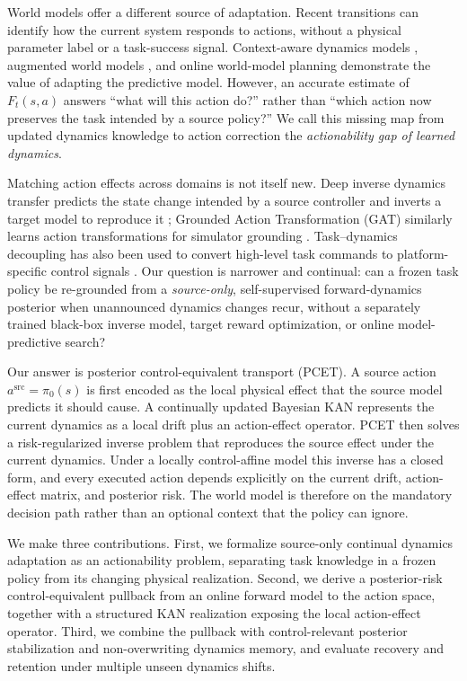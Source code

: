 \documentclass[letterpaper]{article}
\begin{document}
World models offer a different source of adaptation.  Recent transitions can
identify how the current system responds to actions, without a physical
parameter label or a task-success signal.  Context-aware dynamics models
\cite{lee2020cadm}, augmented world models \cite{ball2021augwm}, and online
world-model planning \cite{liu2025onlinewm} demonstrate the value of adapting
the predictive model.  However, an accurate estimate of
$F_t(s,a)$ answers ``what will this action do?'' rather than ``which action now
preserves the task intended by a source policy?''  We call this missing map
from updated dynamics knowledge to action correction the \emph{actionability
gap of learned dynamics}.

Matching action effects across domains is not itself new.  Deep inverse
dynamics transfer predicts the state change intended by a source controller
and inverts a target model to reproduce it \cite{christiano2016inverse};
Grounded Action Transformation (GAT) similarly learns action transformations
for simulator grounding \cite{hanna2021gat}.  Task--dynamics decoupling has
also been used to convert high-level task commands to platform-specific control
signals \cite{liu2023dttd}.  Our question is narrower and continual: can a
frozen task policy be re-grounded from a \emph{source-only}, self-supervised
forward-dynamics posterior when unannounced dynamics changes recur, without a
separately trained black-box inverse model, target reward optimization, or
online model-predictive search?

Our answer is posterior control-equivalent transport (PCET).  A source action
$a^{\mathrm{src}}=\pi_0(s)$ is first encoded as the local physical effect that
the source model predicts it should cause.  A continually updated Bayesian KAN
represents the current dynamics as a local drift plus an action-effect operator.
PCET then solves a risk-regularized inverse problem that reproduces the source
effect under the current dynamics.  Under a locally control-affine model this
inverse has a closed form, and every executed action depends explicitly on the
current drift, action-effect matrix, and posterior risk.  The world model is
therefore on the mandatory decision path rather than an optional context that
the policy can ignore.

We make three contributions.  First, we formalize source-only continual
dynamics adaptation as an actionability problem, separating task knowledge in
a frozen policy from its changing physical realization.  Second, we derive a
posterior-risk control-equivalent pullback from an online forward model to the
action space, together with a structured KAN realization exposing the local
action-effect operator.  Third, we combine the pullback with
control-relevant posterior stabilization and non-overwriting dynamics memory,
and evaluate recovery and retention under multiple unseen dynamics shifts.
\end{document}
